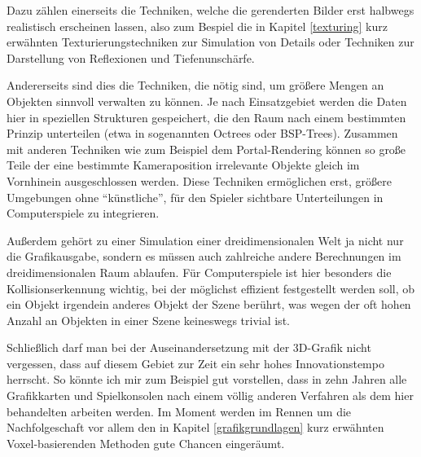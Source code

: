 Dazu zählen einerseits die Techniken, welche die gerenderten Bilder erst halbwegs realistisch erscheinen lassen, also zum Bespiel die in Kapitel \ref{texturing} kurz erwähnten Texturierungstechniken zur Simulation von Details oder Techniken zur Darstellung von Reflexionen und Tiefenunschärfe.

Andererseits sind dies die Techniken, die nötig sind, um größere Mengen an Objekten sinnvoll verwalten zu können. Je nach Einsatzgebiet werden die Daten hier in speziellen Strukturen gespeichert, die den Raum nach einem bestimmten Prinzip unterteilen (etwa in sogenannten Octrees oder BSP-Trees). Zusammen mit anderen Techniken wie zum Beispiel dem Portal-Rendering können so große Teile der eine bestimmte Kameraposition irrelevante Objekte gleich im Vornhinein ausgeschlossen werden. Diese Techniken ermöglichen erst, größere Umgebungen ohne \enquote{künstliche}, für den Spieler sichtbare Unterteilungen in Computerspiele zu integrieren.

Außerdem gehört zu einer Simulation einer dreidimensionalen Welt ja nicht nur die Grafikausgabe, sondern es müssen auch zahlreiche andere Berechnungen im dreidimensionalen Raum ablaufen. Für Computerspiele ist hier besonders die Kollisionserkennung wichtig, bei der möglichst effizient festgestellt werden soll, ob ein Objekt irgendein anderes Objekt der Szene berührt, was wegen der oft hohen Anzahl an Objekten in einer Szene keineswegs trivial ist.

Schließlich darf man bei der Auseinandersetzung mit der 3D-Grafik nicht vergessen, dass auf diesem Gebiet zur Zeit ein sehr hohes Innovationstempo herrscht. So könnte ich mir zum Beispiel gut vorstellen, dass in zehn Jahren alle Grafikkarten und Spielkonsolen nach einem völlig anderen Verfahren als dem hier behandelten arbeiten werden. Im Moment werden im Rennen um die Nachfolgeschaft vor allem den in Kapitel \ref{grafikgrundlagen} kurz erwähnten Voxel-basierenden Methoden gute Chancen eingeräumt.